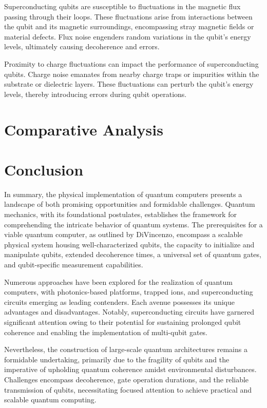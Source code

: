 \documentclass[
  journal=largetwo,
  year=2023,
]{cup-journal}
\begin{document}
Superconducting qubits are susceptible to fluctuations in the magnetic flux passing through their loops. These fluctuations arise from interactions between the qubit and its magnetic surroundings, encompassing stray magnetic fields or material defects. Flux noise engenders random variations in the qubit's energy levels, ultimately causing decoherence and errors.

Proximity to charge fluctuations can impact the performance of superconducting qubits. Charge noise emanates from nearby charge traps or impurities within the substrate or dielectric layers. These fluctuations can perturb the qubit's energy levels, thereby introducing errors during qubit operations.

\section{Comparative Analysis}
\label{sec:comparative}

\section{Conclusion}

In summary, the physical implementation of quantum computers presents a landscape of both promising opportunities and formidable challenges. Quantum mechanics, with its foundational postulates, establishes the framework for comprehending the intricate behavior of quantum systems. The prerequisites for a viable quantum computer, as outlined by DiVincenzo, encompass a scalable physical system housing well-characterized qubits, the capacity to initialize and manipulate qubits, extended decoherence times, a universal set of quantum gates, and qubit-specific measurement capabilities.

Numerous approaches have been explored for the realization of quantum computers, with photonics-based platforms, trapped ions, and superconducting circuits emerging as leading contenders. Each avenue possesses its unique advantages and disadvantages. Notably, superconducting circuits have garnered significant attention owing to their potential for sustaining prolonged qubit coherence and enabling the implementation of multi-qubit gates.

Nevertheless, the construction of large-scale quantum architectures remains a formidable undertaking, primarily due to the fragility of qubits and the imperative of upholding quantum coherence amidst environmental disturbances. Challenges encompass decoherence, gate operation durations, and the reliable transmission of qubits, necessitating focused attention to achieve practical and scalable quantum computing.
\end{document}
